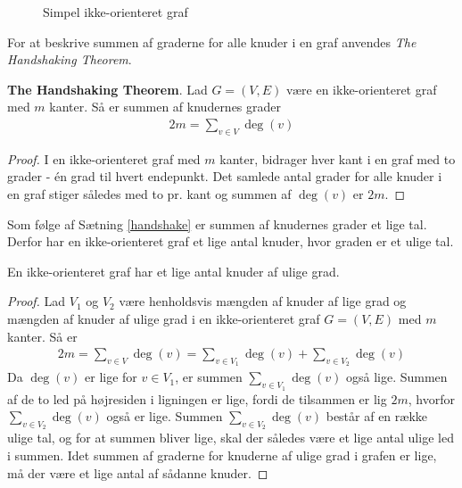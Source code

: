 \begin{figure}[h]
\centering
{}
\caption{Simpel ikke-orienteret graf} \label{eksempel_nabo}
\end{figure}

\noindent For at beskrive summen af graderne for alle knuder i en graf anvendes \textit{The Handshaking Theorem}. 

\begin{thm}\label{handshake}
\textbf{The Handshaking Theorem}. Lad $G=(V,E)$ være en ikke-orienteret graf med $m$ kanter. Så er summen af knudernes grader \\
\begin{align*}
2m=\sum_{v \in V}\deg(v)
\end{align*}
\end{thm}

\begin{proof}
I en ikke-orienteret graf med $m$ kanter, bidrager hver kant i en graf med to grader - én grad til hvert endepunkt. Det samlede antal grader for alle knuder i en graf stiger således med to pr. kant og summen af $\deg(v)$ er $2m$. 
\end{proof}

\noindent Som følge af Sætning \ref{handshake} er summen af knudernes grader et lige tal. Derfor har en ikke-orienteret graf et lige antal knuder, hvor graden er et ulige tal.

\begin{thm}
En ikke-orienteret graf har et lige antal knuder af ulige grad. 
\end{thm}

\begin{proof}
Lad $V_1$ og $V_2$ være henholdsvis mængden af knuder af lige grad og mængden af knuder af ulige grad i en ikke-orienteret graf $G=(V,E)$ med $m$ kanter. Så er \\
\begin{align*}
2m=\sum_{v \in V}\deg(v)=\sum_{v \in V_1}\deg(v)+ \sum_{v \in V_2}\deg(v)
\end{align*}
Da $\deg(v)$ er lige for $v \in V_1$, er summen $\sum_{v \in V_1}\deg(v)$ også lige. Summen af de to led på højresiden i ligningen er lige, fordi de tilsammen er lig $2m$, hvorfor $\sum_{v \in V_2}\deg(v)$ også er lige. Summen $\sum_{v \in V_2}\deg(v)$ består af en række ulige tal, og for at summen bliver lige, skal der således være et lige antal ulige led i summen.
Idet summen af graderne for knuderne af ulige grad i grafen er lige, må der være et lige antal af sådanne knuder.
\end{proof}




